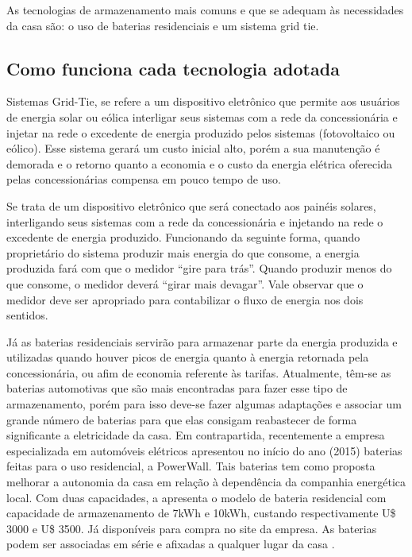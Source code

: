 	As tecnologias de armazenamento mais comuns e que se adequam às necessidades da casa são: o uso de baterias residenciais e um sistema grid tie.

\subsection{Como funciona cada tecnologia adotada}

	Sistemas Grid-Tie, se refere a um dispositivo eletrônico que permite aos usuários de energia solar ou eólica interligar seus sistemas com a rede da concessionária e injetar na rede o excedente de energia produzido pelos sistemas (fotovoltaico ou eólico). Esse sistema gerará um custo inicial alto, porém a sua manutenção é demorada e o retorno quanto a economia e o custo da energia elétrica oferecida pelas concessionárias compensa em pouco tempo de uso.

	Se trata de um dispositivo eletrônico que será conectado aos painéis solares, interligando seus sistemas com a rede da concessionária e injetando na rede o excedente de energia produzido. Funcionando da seguinte forma, quando proprietário do sistema produzir mais energia do que consome, a energia produzida fará com que o medidor “gire para trás”. Quando produzir menos do que consome, o medidor deverá “girar mais devagar”. Vale observar que o medidor deve ser apropriado para contabilizar o fluxo de energia nos dois sentidos.

	Já as baterias residenciais servirão para armazenar parte da energia produzida e utilizadas quando houver picos de energia quanto à energia retornada pela concessionária, ou afim de economia referente às tarifas. Atualmente, têm-se as baterias automotivas que são mais encontradas para fazer esse tipo de armazenamento, porém para isso deve-se fazer algumas adaptações e associar um grande número de baterias para que elas consigam reabastecer de forma significante a eletricidade da casa. Em contrapartida, recentemente a empresa especializada em automóveis elétricos \cite{TESLA} apresentou no início do ano (2015) baterias feitas para o uso residencial, a PowerWall. Tais baterias tem como proposta melhorar a autonomia da casa em relação à dependência da companhia energética local. Com duas capacidades, a \cite{TESLA} apresenta o modelo de bateria residencial com capacidade de armazenamento de 7kWh e 10kWh, custando respectivamente U\$ 3000 e U\$ 3500. Já disponíveis para compra no site da empresa. As baterias podem ser associadas em série e afixadas a qualquer lugar da casa \cite{TESLA}.

